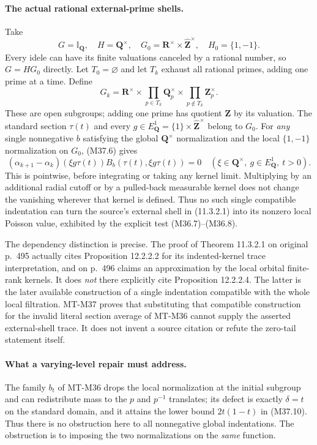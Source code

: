 \paragraph{The actual rational external-prime shells.}
Take
\[
 G=\mathbb I_{\mathbf Q},\quad H=\mathbf Q^\times,
 \quad G_0=\mathbf R^\times\times
                           \widehat{\mathbf Z}^\times,
 \quad H_0=\{1,-1\}.
 \tag{M37.17}
\]
Every idele can have its finite valuations canceled
by a rational number, so $G=HG_0$ directly.
Let $T_0=\varnothing$ and let $T_k$ exhaust all rational
primes, adding one prime at a time.  Define
\[
 G_k=\mathbf R^\times\times
         \prod_{p\in T_k}\mathbf Q_p^\times\times
         \prod_{p\notin T_k}\mathbf Z_p^\times.
 \tag{M37.18}
\]
These are open subgroups; adding one prime has quotient
$\mathbf Z$ by its valuation.  The standard section
$\tau(t)$ and every $g\in E_{\mathbf Q}^1=
\{1\}\times\widehat{\mathbf Z}^\times$ belong to $G_0$.
For \emph{any} single nonnegative $b$ satisfying the
global $\mathbf Q^\times$ normalization and the local
$\{1,-1\}$ normalization on $G_0$, (M37.6) gives
\[
 (\alpha_{k+1}-\alpha_k)(\xi g\tau(t))
                  B_b(\tau(t),\xi g\tau(t))=0
 \quad(\xi\in\mathbf Q^\times,\ g\in E_{\mathbf Q}^1,\ t>0).
 \tag{M37.19}
\]
This is pointwise, before integrating or taking any
kernel limit.  Multiplying by an additional radial
cutoff or by a pulled-back measurable kernel does
not change the vanishing wherever that kernel is
defined.  Thus no such single compatible indentation
can turn the source's external shell in (11.3.2.1)
into its nonzero local Poisson value, exhibited by
the explicit test (M36.7)--(M36.8).

The dependency distinction is precise.  The proof of
Theorem 11.3.2.1 on original p.~495 actually cites
Proposition 12.2.2.2 for its indented-kernel trace
interpretation, and on p.~496 claims an approximation
by the local orbital finite-rank kernels.  It does
\emph{not} there explicitly cite Proposition 12.2.2.4.
The latter is the later available construction of a
single indentation compatible with the whole local
filtration.  MT-M37 proves that substituting that
compatible construction for the invalid literal
section average of MT-M36 cannot supply the asserted
external-shell trace.  It does not invent a source
citation or refute the zero-tail statement itself.

\paragraph{What a varying-level repair must address.}
The family $b_t$ of MT-M36 drops the local normalization
at the initial subgroup and can redistribute mass to
the $p$ and $p^{-1}$ translates; its defect is exactly
$\delta=t$ on the standard domain, and it attains the
lower bound $2t(1-t)$ in (M37.10).  Thus there is no
obstruction here to all nonnegative global indentations.
The obstruction is to imposing the two normalizations
on the \emph{same} function.

